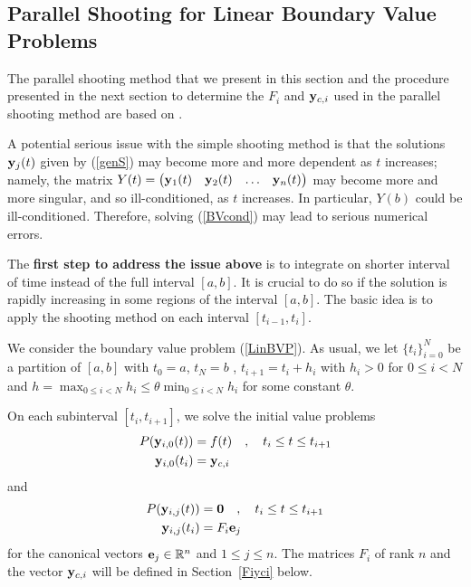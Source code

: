 \subsection{Parallel Shooting for Linear Boundary Value Problems}
\label{SectParShootLinBVP}

The parallel shooting method that we present in this section and the
procedure presented in the next section to determine the $F_i$ and
$\mathbf{y}_{c,i}$ used in the parallel shooting method are based on
\cite{CSD,K}. 

A potential serious issue with the simple shooting method is that
the solutions $\mathbf{y}_j(t)$ given by (\ref{genS}) may become more and
more dependent as $t$ increases; namely, the matrix
$Y(t) = \begin{pmatrix}
\mathbf{y}_1(t) & \mathbf{y}_2(t) & \ldots & \mathbf{y}_n(t) \end{pmatrix}$
may become more and more singular, and so ill-conditioned, as $t$
increases.  In particular, $Y(b)$ could be ill-conditioned.
Therefore, solving (\ref{BVcond}) may lead to serious numerical errors.

The {\bfseries first step to address the issue above} is to integrate
on shorter interval of time instead of the full interval $[a,b]$.
It is crucial to do so if the solution is rapidly increasing in some
regions of the interval $[a,b]$.  The basic idea is to apply the
shooting method on each interval  $[t_{i-1},t_i]$.

We consider the boundary value problem (\ref{LinBVP}).  As usual, we
let $\{ t_i \}_{i=0}^N$ be a partition of $[a,b]$
with $t_0 = a$, $t_N = b$ , $t_{i+1} = t_i + h_i$ with $h_i > 0$
for $0\leq i < N$ and
$\displaystyle h = \max_{0\leq i < N} h_i \leq \theta \min_{0\leq i < N} h_i$
for some constant $\theta$.

On each subinterval $[t_i,t_{i+1}]$, we solve the initial value
problems
\begin{equation} \label{parshootyci}
\begin{split}
P(\mathbf{y}_{i,0}(t)) &= f(t) \quad , \quad t_i \leq t \leq t_{i+1} \\
\mathbf{y}_{i,0}(t_i) &= \mathbf{y}_{c,i}
\end{split}
\end{equation}
and
\begin{equation}\label{parshootFi}
\begin{split}
P(\mathbf{y}_{i,j}(t)) &= \mathbf{0} \quad , \quad t_i \leq t \leq t_{i+1} \\
\mathbf{y}_{i,j}(t_i) &= F_i\mathbf{e}_j
\end{split}
\end{equation}
for the canonical vectors $\mathbf{e}_j \in \mathbb{R}^n$ and $1 \leq j \leq n$.
The matrices $F_i$ of rank $n$ and the vector $\mathbf{y}_{c,i}$ will be
defined in Section~\ref{Fiyci} below.

